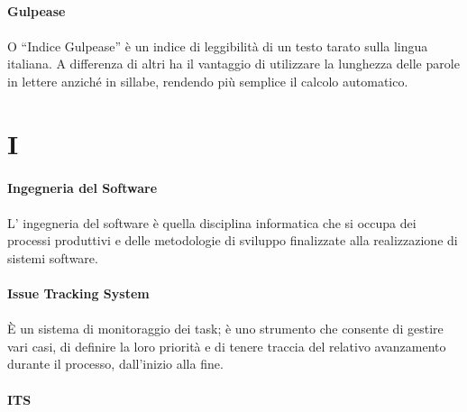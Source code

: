 \documentclass[10pt, a4paper]{article}
\begin{document}
\vspace{2em}
\paragraph{Gulpease}\noindent\hrulefill 
\paragraph{}O “Indice Gulpease” è un indice di leggibilità di un testo tarato sulla
lingua italiana. A differenza di altri ha il vantaggio di utilizzare la lunghezza delle
parole in lettere anziché in sillabe, rendendo più semplice il calcolo automatico.

\newpage
\section{I}
\vspace{2em}
\paragraph{Ingegneria del Software}\noindent\hrulefill
\paragraph{}L' ingegneria del software è quella disciplina informatica che si occupa dei processi produttivi e delle metodologie di sviluppo finalizzate alla realizzazione di sistemi software.

\vspace{2em}
\paragraph{Issue Tracking System}\noindent\hrulefill
\paragraph{}È un sistema di monitoraggio dei task; è uno strumento che consente di gestire vari casi, di definire la loro priorità e di tenere traccia del relativo avanzamento durante il processo, dall'inizio alla fine. 

\vspace{2em}
\paragraph{ITS}\noindent\hrulefill
\end{document}
